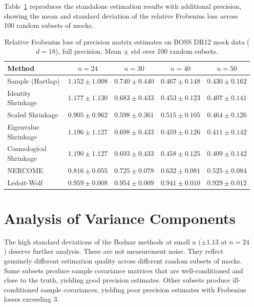 Table~\ref{tab:app_cosmo_full} reproduces the standalone estimation results with additional precision, showing the mean and standard deviation of the relative Frobenius loss across 100 random subsets of mocks.

\begin{table}[htbp]
\centering
\caption{Relative Frobenius loss of precision matrix estimates on BOSS DR12 mock data ($d = 18$), full precision. Mean $\pm$ std over 100 random subsets.}
\label{tab:app_cosmo_full}
\begin{tabular}{@{}lcccc@{}}
\toprule
Method & $n = 24$ & $n = 30$ & $n = 40$ & $n = 50$ \\
\midrule
Sample (Hartlap)         & $1.152 \pm 1.008$ & $0.740 \pm 0.440$ & $0.467 \pm 0.148$ & $0.430 \pm 0.162$ \\
Identity Shrinkage       & $1.177 \pm 1.130$ & $0.683 \pm 0.433$ & $0.453 \pm 0.123$ & $0.407 \pm 0.141$ \\
Scaled Shrinkage         & $0.905 \pm 0.962$ & $0.598 \pm 0.361$ & $0.515 \pm 0.105$ & $0.464 \pm 0.126$ \\
Eigenvalue Shrinkage     & $1.196 \pm 1.127$ & $0.698 \pm 0.433$ & $0.459 \pm 0.126$ & $0.411 \pm 0.142$ \\
Cosmological Shrinkage   & $1.190 \pm 1.127$ & $0.693 \pm 0.433$ & $0.458 \pm 0.125$ & $0.409 \pm 0.142$ \\
NERCOME                  & $0.816 \pm 0.055$ & $0.725 \pm 0.078$ & $0.632 \pm 0.081$ & $0.525 \pm 0.084$ \\
Ledoit-Wolf              & $0.959 \pm 0.008$ & $0.954 \pm 0.009$ & $0.941 \pm 0.010$ & $0.929 \pm 0.012$ \\
\bottomrule
\end{tabular}
\end{table}

\section{Analysis of Variance Components}

The high standard deviations of the Bodnar methods at small $n$ ($\pm 1.13$ at $n = 24$) deserve further analysis. These are not measurement noise. They reflect genuinely different estimation quality across different random subsets of mocks. Some subsets produce sample covariance matrices that are well-conditioned and close to the truth, yielding good precision estimates. Other subsets produce ill-conditioned sample covariances, yielding poor precision estimates with Frobenius losses exceeding 3.

